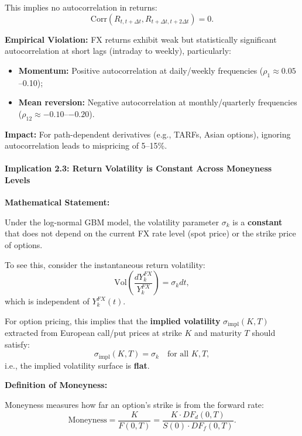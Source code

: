 \begin{enumerate}
	This implies no autocorrelation in returns:
	\begin{equation}
		\text{Corr}(R_{t,t+\Delta t}, R_{t+\Delta t, t+2\Delta t}) = 0.
	\end{equation}
	
	\textbf{Empirical Violation:} FX returns exhibit weak but statistically significant autocorrelation at short lags (intraday to weekly), particularly:
	\begin{itemize}
		\item \textbf{Momentum:} Positive autocorrelation at daily/weekly frequencies ($\rho_1 \approx 0.05$--0.10);
		\item \textbf{Mean reversion:} Negative autocorrelation at monthly/quarterly frequencies ($\rho_{12} \approx -0.10$--$-0.20$).
	\end{itemize}
	
	\textbf{Impact:} For path-dependent derivatives (e.g., TARFs, Asian options), ignoring autocorrelation leads to mispricing of 5--15\%.
\end{enumerate}

\paragraph{Implication 2.3: Return Volatility is Constant Across Moneyness Levels}

\textbf{Mathematical Statement:}

Under the log-normal GBM model, the volatility parameter $\sigma_k$ is a \textbf{constant} that does not depend on the current FX rate level (spot price) or the strike price of options. 

To see this, consider the instantaneous return volatility:
\begin{equation}
	\text{Vol}\!\left(\frac{dY_k^{FX}}{Y_k^{FX}}\right) = \sigma_k dt,
\end{equation}
which is independent of $Y_k^{FX}(t)$.

For option pricing, this implies that the \textbf{implied volatility} $\sigma_{\text{impl}}(K,T)$ extracted from European call/put prices at strike $K$ and maturity $T$ should satisfy:
\begin{equation}
	\sigma_{\text{impl}}(K,T) = \sigma_k \quad \text{for all } K, T,
\end{equation}
i.e., the implied volatility surface is \textbf{flat}.

\textbf{Definition of Moneyness:}

Moneyness measures how far an option's strike is from the forward rate:
\begin{equation}
	\text{Moneyness} = \frac{K}{F(0,T)} = \frac{K \cdot DF_d(0,T)}{S(0) \cdot DF_f(0,T)}.
\end{equation}

